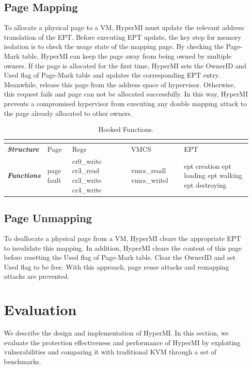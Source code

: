 \documentclass[conference]{IEEEtran}
\begin{document}
\subsection {Page Mapping}

To allocate a physical page to a VM, HyperMI must update the relevant address translation of the EPT.
Before executing EPT update, the key step for memory isolation is to check the usage state of the mapping page. 
By checking the Page-Mark table, HyperMI can keep the page away from being owned by multiple owners. If the page is allocated for the first time, HyperMI sets the OwnerID and Used flag of Page-Mark table and updates the corresponding EPT entry. Meanwhile, release this page from the address space of hypervisor. Otherwise, this request fails and page can not be allocated successfully. In this way, HyperMI prevents a compromised hypervisor from executing any double mapping attack to the page already allocated to other owners.


\begin{table}
\centering
\caption{Hooked Functions.}\label{tabhook}
\begin{tabular}{p{1cm}|p{1.2cm}|p{1.1cm}|p{1.4cm}|p{1.6cm}}
\hline
\multicolumn{5}{c}{\bfseries\textbf\centering{Hooked Functions}}\\
\hline
{\itshape\bfseries Structure} & Page & Regs & VMCS & EPT \\
\hline
{\itshape\bfseries Functions} &page fault & cr0\_write cr3\_read cr3\_write cr4\_write & vmcs\_readl vmcs\_writel & ept creation ept loading ept walking ept destroying \\
\hline
\end{tabular}
\end{table}

\subsection {Page Unmapping}

To deallocate a physical page from a VM, HyperMI clears the appropriate EPT to invalidate this mapping. In addition, HyperMI clears the content of this page before resetting the Used flag of Page-Mark table. Clear the OwnerID and set Used flag to be free. With this approach, page reuse attacks and remapping attacks are prevented.
\fi


\section{Evaluation}\label{sec:evaluation}
We describe the design and implementation of HyperMI. In this section, we evaluate the protection effectiveness and performance of HyperMI by exploiting vulnerabilities and comparing it with traditional KVM through a set of benchmarks.
\end{document}
